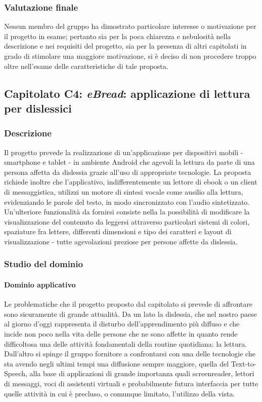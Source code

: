 		\subsubsection{Valutazione finale}
		Nessun membro del gruppo ha dimostrato particolare interesse o motivazione per il progetto in esame; pertanto sia per la poca chiarezza e 
		nebulosità nella descrizione e nei requisiti del progetto, sia per la presenza di altri capitolati in grado di stimolare una maggiore 
		motivazione, si è deciso di non procedere troppo oltre nell'esame delle caratteristiche di tale proposta.
		
	\subsection{Capitolato C4: \emph{eBread}: applicazione di lettura per dislessici}
		\subsubsection{Descrizione}
		Il progetto prevede la realizzazione di un'applicazione per dispositivi mobili - smartphone e tablet - in ambiente Android che agevoli la 
		lettura da parte di una persona affetta da dislessia grazie all'uso di appropriate tecnologie. La proposta richiede inoltre che l'applicativo, 
		indifferentemente un lettore di ebook o un client di messaggistica, utilizzi un motore di sintesi vocale come ausilio alla lettura, evidenziando 
		le parole del testo, in modo sincronizzato con l'audio sintetizzato. Un'ulteriore funzionalità da fornirsi consiste nella la possibilità di 
		modificare la visualizzazione del contenuto da leggersi attraverso particolari sistemi di colori, spaziature fra lettere, differenti dimensioni 
		e tipo dei caratteri e layout di visualizzazione - tutte agevolazioni preziose per persone affette da dislessia.
		\subsubsection{Studio del dominio}
			\paragraph{Dominio applicativo}
			Le problematiche che il progetto proposto dal capitolato si prevede di affrontare sono sicuramente di grande attualità. Da un lato la 
			dislessia, che nel nostro paese al giorno d'oggi rappresenta il disturbo dell'apprendimento più diffuso e che incide non poco nella 
			vita delle persone che ne sono affette in quanto rende difficoltosa una delle attività fondamentali della routine quotidiana: la lettura. 
			Dall'altro si spinge il gruppo fornitore a confrontarsi con una delle tecnologie che sta avendo negli ultimi tempi una diffusione sempre 
			maggiore, quella del Text-to-Speech, alla base di applicazioni di grande importanza quali screenreader, lettori di messaggi, voci di 
			assistenti virtuali e probabilmente futura interfaccia per tutte quelle attività in cui è precluso, o comunque limitato, l'utilizzo della vista.
